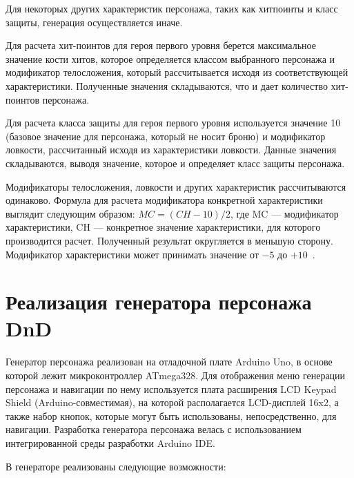 \documentclass{altsu-report}
\begin{document}
Для некоторых других характеристик персонажа, таких как хит\-поинты и класс защиты, генерация осуществляется иначе.

Для расчета хит-поинтов для героя первого уровня берется максимальное значение кости хитов, которое определяется классом выбранного персонажа и модификатор телосложения, который рассчитывается исходя из соответствующей характеристики. Полученные значения складываются, что и дает количество хит-поинтов персонажа.

Для расчета класса защиты для героя первого уровня используется значение 10 (базовое значение для персонажа, который не носит броню) и модификатор ловкости, рассчитанный исходя из характеристики ловкости. Данные значения складываются, выводя значение, которое и определяет класс защиты персонажа.

Модификаторы телосложения, ловкости и других характеристик рассчитываются одинаково. Формула для расчета модификатора конкретной характеристики выглядит следующим образом: $MC = (CH - 10) / 2$, где MC --- модификатор характеристики, CH --- конкретное значение характеристики, для которого производится расчет. Полученный результат округляется в меньшую сторону. Модификатор характеристики может принимать значение от $-5$ до $+10$~\cite{D&D_forms}.

\section{Реализация генератора персонажа DnD}

Генератор персонажа реализован на отладочной плате Arduino Uno, в основе которой лежит микроконтроллер ATmega328. Для отображения меню генерации персонажа и навигации по нему используется плата расширения LCD Keypad Shield (Arduino-совместимая), на которой располагается LCD-дисплей 16x2, а также набор кнопок, которые могут быть использованы, непосредственно, для навигации. Разработка генератора персонажа велась с использованием интегрированной среды разработки Arduino IDE.

В генераторе реализованы следующие возможности:
\end{document}
